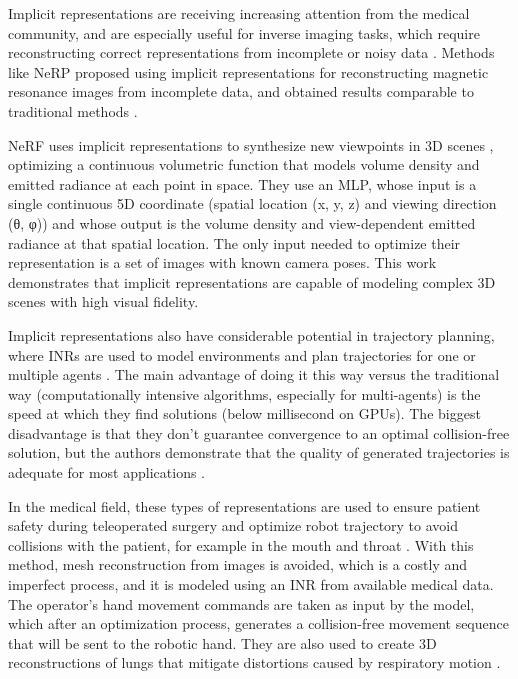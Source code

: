 Implicit representations are receiving increasing attention from the medical community, and are
especially useful for inverse imaging tasks, which require reconstructing correct representations from incomplete or noisy data \cite{molaei2023implicitneuralrepresentationmedical}.
Methods like NeRP proposed using implicit representations for reconstructing magnetic resonance images from incomplete data,
and obtained results comparable to traditional methods \cite{shen2023nerpimplicitneuralrepresentation}.

NeRF uses implicit representations to synthesize new viewpoints in 3D scenes \cite{mildenhall2020nerfrepresentingscenesneural},
optimizing a continuous volumetric function that models volume density and emitted radiance at each point in space.
They use an MLP, whose input is a single continuous 5D coordinate (spatial location (x, y, z) and viewing direction (θ, φ))
and whose output is the volume density and view-dependent emitted radiance at that spatial location.
The only input needed to optimize their representation is a set of images with known camera poses.
This work demonstrates that implicit representations are capable of modeling complex 3D scenes with high visual fidelity.

Implicit representations also have considerable potential in trajectory planning,
where INRs are used to model environments and plan trajectories for one or multiple agents \cite{yu2024neuraltrajectorymodelimplicit}.
The main advantage of doing it this way versus the traditional way (computationally intensive algorithms, especially for multi-agents) is the speed at which they find solutions (below millisecond on GPUs).
The biggest disadvantage is that they don't guarantee convergence to an optimal collision-free solution, but the authors demonstrate that the quality of generated trajectories is adequate for most applications \cite{trajectinr}.

In the medical field, these types of representations are used to ensure patient safety during teleoperated surgery and optimize robot trajectory to avoid collisions with the patient, for example in the mouth and throat \cite{teleoperatdrob}.
With this method, mesh reconstruction from images is avoided, which is a costly and imperfect process, and it is modeled using an INR from available medical data.
The operator's hand movement commands are taken as input by the model, which after an optimization process, generates a collision-free movement sequence that will be sent to the robotic hand.
They are also used to create 3D reconstructions of lungs that mitigate distortions caused by respiratory motion \cite{velikova2024implicitneuralrepresentationsbreathingcompensated}.

